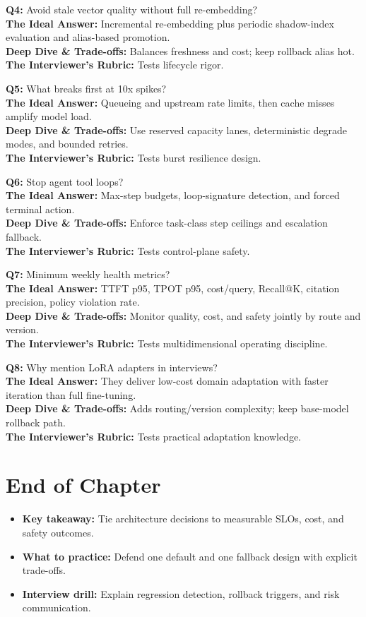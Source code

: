 \textbf{Q4:} Avoid stale vector quality without full re-embedding?\\
\textbf{The Ideal Answer:} Incremental re-embedding plus periodic shadow-index evaluation and alias-based promotion.\\
\textbf{Deep Dive \& Trade-offs:} Balances freshness and cost; keep rollback alias hot.\\
\textbf{The Interviewer's Rubric:} Tests lifecycle rigor.

\textbf{Q5:} What breaks first at 10x spikes?\\
\textbf{The Ideal Answer:} Queueing and upstream rate limits, then cache misses amplify model load.\\
\textbf{Deep Dive \& Trade-offs:} Use reserved capacity lanes, deterministic degrade modes, and bounded retries.\\
\textbf{The Interviewer's Rubric:} Tests burst resilience design.

\textbf{Q6:} Stop agent tool loops?\\
\textbf{The Ideal Answer:} Max-step budgets, loop-signature detection, and forced terminal action.\\
\textbf{Deep Dive \& Trade-offs:} Enforce task-class step ceilings and escalation fallback.\\
\textbf{The Interviewer's Rubric:} Tests control-plane safety.

\textbf{Q7:} Minimum weekly health metrics?\\
\textbf{The Ideal Answer:} TTFT p95, TPOT p95, cost/query, Recall@K, citation precision, policy violation rate.\\
\textbf{Deep Dive \& Trade-offs:} Monitor quality, cost, and safety jointly by route and version.\\
\textbf{The Interviewer's Rubric:} Tests multidimensional operating discipline.

\textbf{Q8:} Why mention LoRA adapters in interviews?\\
\textbf{The Ideal Answer:} They deliver low-cost domain adaptation with faster iteration than full fine-tuning.\\
\textbf{Deep Dive \& Trade-offs:} Adds routing/version complexity; keep base-model rollback path.\\
\textbf{The Interviewer's Rubric:} Tests practical adaptation knowledge.

\section*{End of Chapter}
\begin{itemize}
  \item \textbf{Key takeaway:} Tie architecture decisions to measurable SLOs, cost, and safety outcomes.
  \item \textbf{What to practice:} Defend one default and one fallback design with explicit trade-offs.
  \item \textbf{Interview drill:} Explain regression detection, rollback triggers, and risk communication.
\end{itemize}
